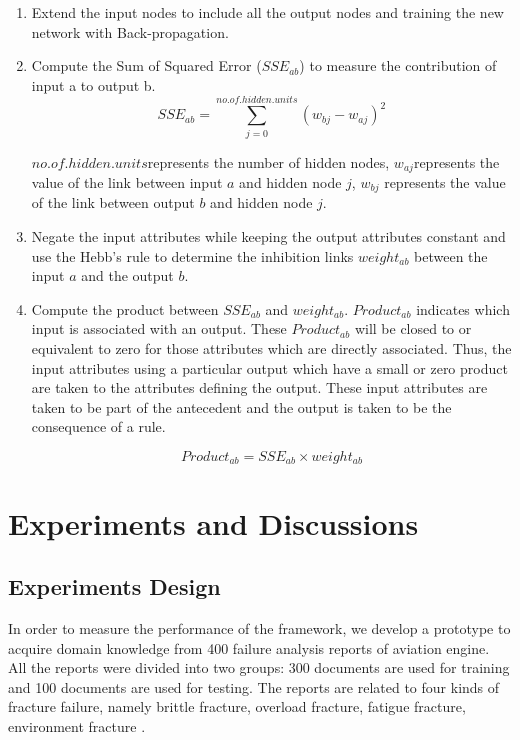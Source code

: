 \documentclass{elsarticle}
\begin{document}
\begin{enumerate}
\item Extend the input nodes to include all the output nodes and
  training the new network with Back-propagation.
\item Compute the Sum of Squared Error ($SSE_{ab}$) to measure the
  contribution of input a to output b.
  \begin{equation}
    \label{eq:2}
    SSE_{ab} = \sum_{j=0}^{no.of.hidden.units}{(w_{bj}-w_{aj})}^2
  \end{equation}

$no.of.hidden.units$represents the number of hidden nodes,
$w_{aj}$represents the value of the link between input $a$ and hidden
node $j$, $w_{bj}$ represents the value of the link between output $b$
and hidden node $j$. 
\item  Negate the input attributes while keeping the output attributes
constant and use the Hebb’s rule to determine the inhibition links
$weight_{ab}$ between the input $a$ and the output $b$.
\item Compute the product between $SSE_{ab}$ and
$weight_{ab}$. $Product_{ab}$ indicates which input is associated with
an output. These $Product_{ab}$ will be closed to or equivalent to
zero for those attributes which are directly associated. Thus, the
input attributes using a particular output which have a small or zero
product are taken to the attributes defining the output. These input
attributes are taken to be part of the antecedent and the output is
taken to be the consequence of a rule. 

\begin{equation}
  \label{eq:3}
  Product_{ab} = SSE_{ab}\times weight_{ab}
\end{equation}


\end{enumerate}

\section{Experiments and Discussions }
\label{sec:exper-disc-}

\subsection{Experiments Design
}
\label{sec:experiments-design-}

In order to measure the performance of the framework, we develop a
prototype  to acquire domain
knowledge from 400 failure analysis reports of aviation engine. All
the reports were divided into two groups: 300 documents are used for
training and 100 documents are used for testing. The reports are
related to four kinds of fracture failure, namely brittle fracture,
overload fracture, fatigue fracture, environment fracture
\cite{medema}.
\end{document}
